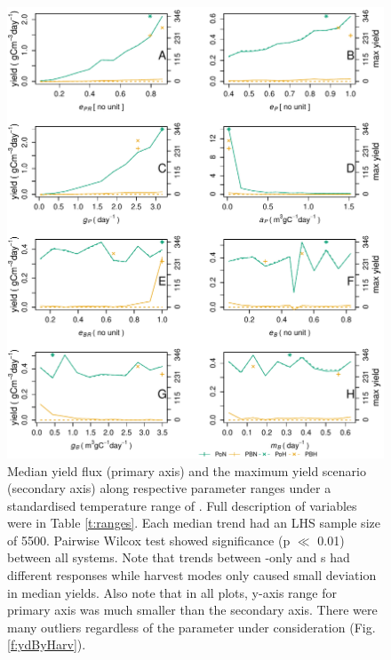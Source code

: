 \documentclass[../thesis.tex]{subfiles} %
\begin{document}
\begin{figure}[H]
    \centering
    \includegraphics[width=\linewidth]{result/yieldFlux.pdf}
    \caption[Yield flux median in biological parameter space]{Median yield flux (primary axis) and the maximum yield scenario (secondary axis) along respective parameter ranges under a standardised temperature range of \temp.  Full description of variables were in Table \ref{t:ranges}.  Each median trend had an LHS sample size of 5500.  Pairwise Wilcox test showed significance (p $\ll$ 0.01) between all systems.  Note that trends between \phy-only and \pbs s had different responses while harvest modes only caused small deviation in median yields.  Also note that in all plots, y-axis range for primary axis was much smaller than the secondary axis.  There were many outliers regardless of the parameter under consideration (Fig.\ref{f:ydByHarv}).}
    \label{f:ydByPara}
\end{figure}
\end{document}
